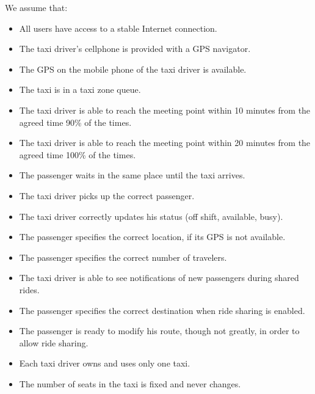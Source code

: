 We assume that:
\begin{itemize}
    \item All users have access to a stable Internet connection.
    \item The taxi driver's cellphone is provided with a GPS navigator.
    \item The GPS on the mobile phone of the taxi driver is available.
    \item The taxi is in a taxi zone queue.
    \item The taxi driver is able to reach the meeting point within 10 minutes from the agreed time 90\% of the times.
    \item The taxi driver is able to reach the meeting point within 20 minutes from the agreed time 100\% of the times.
    \item The passenger waits in the same place until the taxi arrives.
    \item The taxi driver picks up the correct passenger.
    \item The taxi driver correctly updates his status (off shift, available, busy).
    \item The passenger specifies the correct location, if its GPS is not available.
    \item The passenger specifies the correct number of travelers.
    \item The taxi driver is able to see notifications of new passengers during shared rides.
    \item The passenger specifies the correct destination when ride sharing is enabled.
    \item The passenger is ready to modify his route, though not greatly, in order to allow ride sharing.
    \item Each taxi driver owns and uses only one taxi.
    \item The number of seats in the taxi is fixed and never changes.
\end{itemize}

